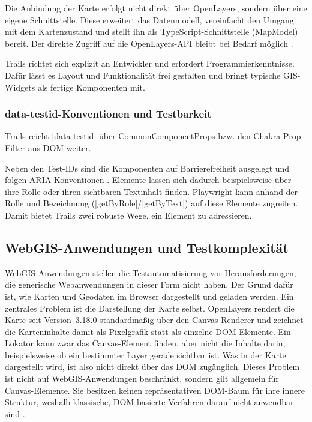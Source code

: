 Die Anbindung der Karte erfolgt nicht direkt über OpenLayers, sondern über eine eigene Schnittstelle. Diese erweitert das Datenmodell, vereinfacht den Umgang mit dem Kartenzustand und stellt ihn als TypeScript-Schnittstelle (MapModel) bereit. Der direkte Zugriff auf die OpenLayers-\ac{API} bleibt bei Bedarf möglich \parencite{52north_gmbh_open_2025}.

Trails richtet sich explizit an Entwickler und erfordert Programmierkenntnisse. Dafür lässt es Layout und Funktionalität frei gestalten und bringt typische \ac{GIS}-Widgets als fertige Komponenten mit.

\subsubsection{data-testid-Konventionen und Testbarkeit}

Trails reicht \code|data-testid| über CommonComponentProps \parencite[react-utils]{open_pioneer_open-pioneerreact-utils_nodate} bzw. den Chakra-Prop-Filter \parencite{chakra_systems_chakra_2026} ans \ac{DOM} weiter.

Neben den Test-IDs sind die Komponenten auf Barrierefreiheit ausgelegt und folgen \ac{ARIA}-Konventionen \parencite{52north_gmbh_open_2025}. Elemente lassen sich dadurch beispielsweise über ihre Rolle oder ihren sichtbaren Textinhalt finden. Playwright kann anhand der Rolle und Bezeichnung (\code|getByRole|/\code|getByText|) auf diese Elemente zugreifen. Damit bietet Trails zwei robuste Wege, ein Element zu adressieren.

\subsection{WebGIS-Anwendungen und Testkomplexität}

WebGIS-Anwendungen stellen die Testautomatisierung vor Herausforderungen, die generische Webanwendungen in dieser Form nicht haben. Der Grund dafür ist, wie Karten und Geodaten im Browser dargestellt und geladen werden. Ein zentrales Problem ist die Darstellung der Karte selbst. OpenLayers rendert die Karte seit Version~3.18.0 standardmäßig über den Canvas-Renderer \parencite[v3.18.0]{openlayers_upgrade_2026} und zeichnet die Karteninhalte damit als Pixelgrafik statt als einzelne \ac{DOM}-Elemente. Ein Lokator kann zwar das Canvas-Element finden, aber nicht die Inhalte darin, beispielsweise ob ein bestimmter Layer gerade sichtbar ist. Was in der Karte dargestellt wird, ist also nicht direkt über das \ac{DOM} zugänglich. Dieses Problem ist nicht auf WebGIS-Anwendungen beschränkt, sondern gilt allgemein für Canvas-Elemente. Sie besitzen keinen repräsentativen \ac{DOM}-Baum für ihre innere Struktur, weshalb klassische, \ac{DOM}-basierte Verfahren darauf nicht anwendbar sind \parencite[S.~1]{bajammal_web_2018}.

